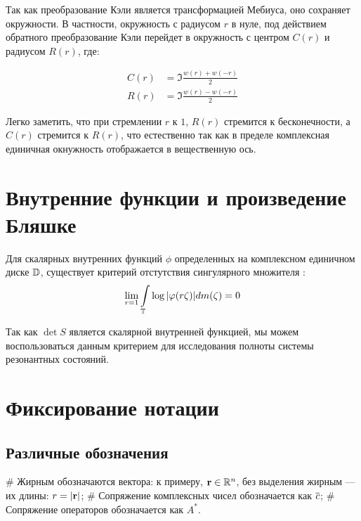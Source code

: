 Так как преобразование Кэли является трансформацией Мебиуса, оно сохраняет окружности. В частности, окружность с радиусом $r$ в нуле, под действием обратного преобразование Кэли перейдет в окружность с центром $C(r)$ и радиусом $R(r)$, где:

\begin{equation}
\begin{aligned}
   C(r) &= \Im \frac{w(r) + w(-r)}{2}
\\ R(r) &= \Im \frac{w(r) - w(-r)}{2}
\end{aligned}
\end{equation}

Легко заметить, что при стремлении $r$ к $1$, $R(r)$ стремится к бесконечности, а $C(r)$ стремится к $R(r)$, что естественно так как в пределе комплексная единичная окнужность отображается в вещественную ось.




\section{Внутренние функции и произведение Бляшке}
Для скалярных внутренних функций $\phi$ определенных на комплексном единичном диске $\mathbb{D}$, существует критерий отстутствия сингулярного множителя \cite[стр. 99]{nikolskii}:
\[
\lim\limits_{r = 1} \int\limits_{\mathbb{T}} \log \abs{\varphi(r \zeta)} d m(\zeta) = 0
\]

Так как $\det S$ является скалярной внутренней функцией, мы можем воспользоваться данным критерием для исследования полноты системы резонантных состояний.


\section{Фиксирование нотации}
\subsection{Различные обозначения}

\begin{ilist}
# Жирным обозначаются вектора: к примеру, $\vb{r} \in \mathbb{R}^n$, без выделения жирным — их длины: $r = |\vb{r}|$;
# Сопряжение комплексных чисел обозначается как $\overline{c}$;
# Сопряжение операторов обозначается как $A^*$.
\end{ilist}

